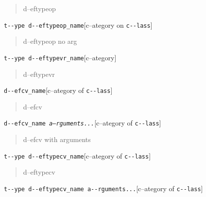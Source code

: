\documentclass{book}
\begin{document}
\begin{titlepage}
%
\begin{quote}
\unskip{\parskip=0pt\noindent}%
d--eftypeop
\end{quote}

\noindent\texttt{t{-}{-}ype d{-}{-}eftypeop\_name}\hfill[c--ategory on \texttt{c{-}{-}lass}]



%
\begin{quote}
\unskip{\parskip=0pt\noindent}%
d--eftypeop no arg
\end{quote}

\noindent\texttt{t{-}{-}ype d{-}{-}eftypevr\_name}\hfill[c--ategory]



%
\begin{quote}
\unskip{\parskip=0pt\noindent}%
d--eftypevr
\end{quote}

\noindent\texttt{d{-}{-}efcv\_name}\hfill[c--ategory of \texttt{c{-}{-}lass}]



%
\begin{quote}
\unskip{\parskip=0pt\noindent}%
d--efcv
\end{quote}

\noindent\texttt{d{-}{-}efcv\_name \EmbracOn{}\textnormal{\textsl{a--rguments...}}\EmbracOff{}}\hfill[c--ategory of \texttt{c{-}{-}lass}]



%
\begin{quote}
\unskip{\parskip=0pt\noindent}%
d--efcv with arguments
\end{quote}

\noindent\texttt{t{-}{-}ype d{-}{-}eftypecv\_name}\hfill[c--ategory of \texttt{c{-}{-}lass}]



%
\begin{quote}
\unskip{\parskip=0pt\noindent}%
d--eftypecv
\end{quote}

\noindent\texttt{t{-}{-}ype d{-}{-}eftypecv\_name a{-}{-}rguments...}\hfill[c--ategory of \texttt{c{-}{-}lass}]




\end{titlepage}
\end{document}
